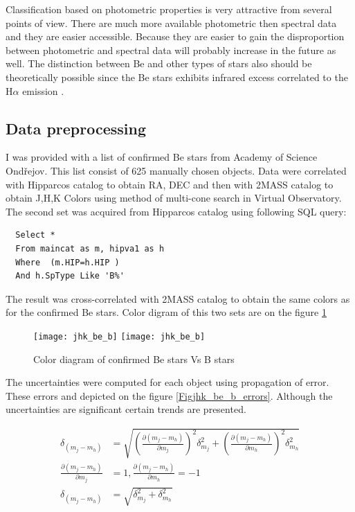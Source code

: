 Classification based on photometric properties is very attractive from
several points of view. There are much more available photometric then
spectral data and they are easier accessible. Because they are easier
to gain the disproportion between photometric and spectral data will
probably increase in the future as well. The distinction between Be
and other types of stars also should be theoretically possible since
the Be stars exhibits infrared excess correlated to the H$\alpha$
emission \citep{van1995halpha}.

\subsection{Data preprocessing}

I was provided with a list of confirmed Be stars from Academy of
Science Ondřejov. This list consist of 625 manually chosen
objects. Data were correlated with Hipparcos
\citep{perryman1997hipparcos} catalog to obtain RA, DEC and then with
2MASS \citep{skrutskie2006two} catalog to obtain J,H,K Colors using
method of multi-cone search in Virtual Observatory. The second set was
acquired from Hipparcos catalog using following SQL query:

\begin{lstlisting}
  Select * 
  From maincat as m, hipva1 as h 
  Where  (m.HIP=h.HIP )  
  And h.SpType Like 'B%'
\end{lstlisting}

The result was cross-correlated with 2MASS catalog to obtain the same
colors as for the confirmed Be stars. Color digram of this two sets
are on the figure \ref{Figjhk_be_b}

    \begin{figure}[!htbp]
      \begin{center}
        \leavevmode
        \ifpdf
        \texttt{[image: jhk\_be\_b]}
        \else
        \texttt{[image: jhk\_be\_b]}
        \fi
        \caption{Color diagram of confirmed Be stars Vs B stars}
        \label{Figjhk_be_b}
      \end{center}
    \end{figure}

    The uncertainties were computed for each object using propagation
    of error. These errors and depicted on the figure
    \ref{Figjhk_be_b_errors}. Although the uncertainties are
    significant certain trends are presented.

\begin{align*}
  \delta_{(m_j - m_h)} &= \sqrt{\left(\frac{\partial(m_j - m_h) }{\partial
        m_j}\right)^2\delta_{m_j}^2 + \left(\frac{\partial(m_j - m_h) }{\partial
        m_h}\right)^2\delta_{m_h}^2} \\
  \frac{\partial(m_j - m_h) }{\partial m_j } &= 1,\frac{\partial(m_j - m_h)
  }{\partial m_h } = -1 \\
  \delta_{(m_j - m_h)} &= \sqrt{\delta_{m_j}^2 + \delta_{m_h}^2}
\end{align*}


